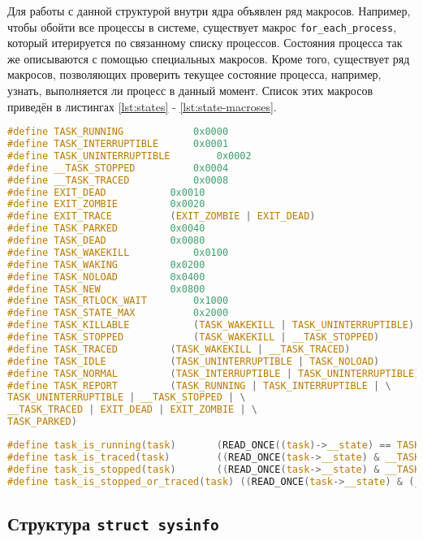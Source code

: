 Для работы с данной структурой внутри ядра объявлен ряд макросов. Например, чтобы обойти все процессы в системе, существует макрос \texttt{for\_each\_process}, который итерируется по связанному списку процессов. Состояния процесса так же описываются с помощью специальных макросов. Кроме того, существует ряд макросов, позволяющих проверить текущее состояние процесса, например, узнать, выполняется ли процесс в данный момент. Список этих макросов приведён в листингах \ref{lst:states} - \ref{lst:state-macroses}.\\

\begin{lstlisting}[label=lst:states, caption=Описание состояний процесса с помощью макросов, language=c]
#define TASK_RUNNING			0x0000
#define TASK_INTERRUPTIBLE		0x0001
#define TASK_UNINTERRUPTIBLE		0x0002
#define __TASK_STOPPED			0x0004
#define __TASK_TRACED			0x0008
#define EXIT_DEAD			0x0010
#define EXIT_ZOMBIE			0x0020
#define EXIT_TRACE			(EXIT_ZOMBIE | EXIT_DEAD)
#define TASK_PARKED			0x0040
#define TASK_DEAD			0x0080
#define TASK_WAKEKILL			0x0100
#define TASK_WAKING			0x0200
#define TASK_NOLOAD			0x0400
#define TASK_NEW			0x0800
#define TASK_RTLOCK_WAIT		0x1000
#define TASK_STATE_MAX			0x2000
#define TASK_KILLABLE			(TASK_WAKEKILL | TASK_UNINTERRUPTIBLE)
#define TASK_STOPPED			(TASK_WAKEKILL | __TASK_STOPPED)
#define TASK_TRACED			(TASK_WAKEKILL | __TASK_TRACED)
#define TASK_IDLE			(TASK_UNINTERRUPTIBLE | TASK_NOLOAD)
#define TASK_NORMAL			(TASK_INTERRUPTIBLE | TASK_UNINTERRUPTIBLE)
#define TASK_REPORT			(TASK_RUNNING | TASK_INTERRUPTIBLE | \
TASK_UNINTERRUPTIBLE | __TASK_STOPPED | \
__TASK_TRACED | EXIT_DEAD | EXIT_ZOMBIE | \
TASK_PARKED)
\end{lstlisting}

\begin{lstlisting}[label=lst:state-macroses, caption=Макросы\, с помощью которых можно узнать текущее состояние процесса, language=c]
#define task_is_running(task)		(READ_ONCE((task)->__state) == TASK_RUNNING)
#define task_is_traced(task)		((READ_ONCE(task->__state) & __TASK_TRACED) != 0)
#define task_is_stopped(task)		((READ_ONCE(task->__state) & __TASK_STOPPED) != 0)
#define task_is_stopped_or_traced(task)	((READ_ONCE(task->__state) & (__TASK_STOPPED | __TASK_TRACED)) != 0)
\end{lstlisting}

\subsection{Структура \texttt{struct sysinfo}}

